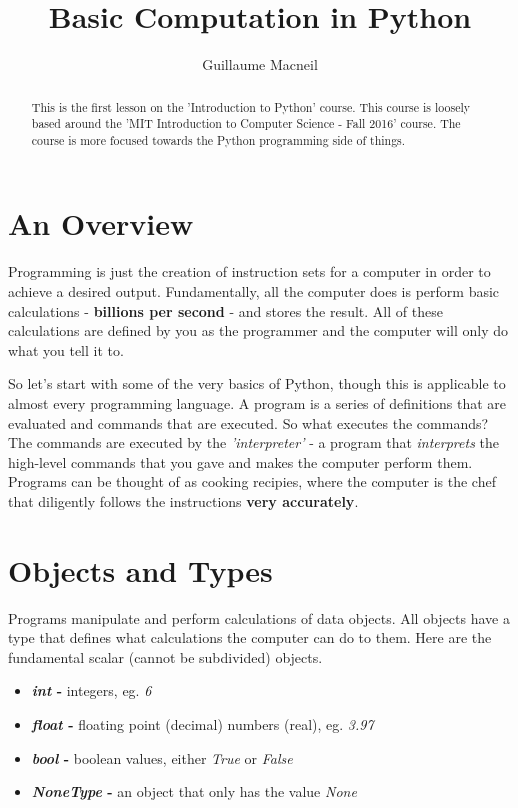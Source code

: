 \documentclass{article}
\title{Basic Computation in Python}
\author{Guillaume Macneil}
\begin{document}
\maketitle

\begin{abstract}
This is the first lesson on the 'Introduction to Python' course. This course is loosely based around the 'MIT Introduction to Computer Science - Fall 2016' course. The course is more focused towards the Python programming side of things.
\end{abstract}

\section{An Overview}
Programming is just the creation of instruction sets for a computer in order to achieve a desired output. Fundamentally, all the computer does is perform basic calculations - \textbf{billions per second} - and stores the result. All of these calculations are defined by you as the programmer and the computer will only do what you tell it to. \medskip

So let's start with some of the very basics of Python, though this is applicable to almost every programming language. A program is a series of definitions that are evaluated and commands that are executed. So what executes the commands? The commands are executed by the \textit{'interpreter'} - a program that \textit{interprets} the high-level commands that you gave and makes the computer perform them. Programs can be thought of as cooking recipies, where the computer is the chef that diligently follows the instructions \textbf{very accurately}. \medskip

\section{Objects and Types}
Programs manipulate and perform calculations of data objects. All objects have a type that defines what calculations the computer can do to them. Here are the fundamental scalar (cannot be subdivided) objects.
\begin{itemize}
\item \textbf{\textit{int} -} integers, eg. \textit{6}
\item \textbf{\textit{float} -} floating point (decimal) numbers (real), eg. \textit{3.97}
\item \textbf{\textit{bool} -} boolean values, either \textit{True} or \textit{False}
\item \textbf{\textit{NoneType} -} an object that only has the value \textit{None}
\end{itemize}
\end{document}
